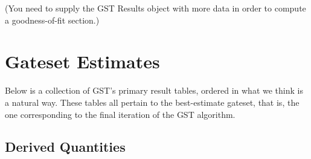 \documentclass{article}[11pt]
\begin{document}
{}{ (You need to supply the GST Results object with more data in order to compute a goodness-of-fit section.) }

\FloatBarrier

\section{Gateset Estimates}
Below is a collection of GST's primary result tables, ordered in what we think is a natural way.  These tables all pertain to the best-estimate gateset, that is, the one corresponding to the final iteration of the GST algorithm.

\subsection{Derived Quantities}
\end{document}

